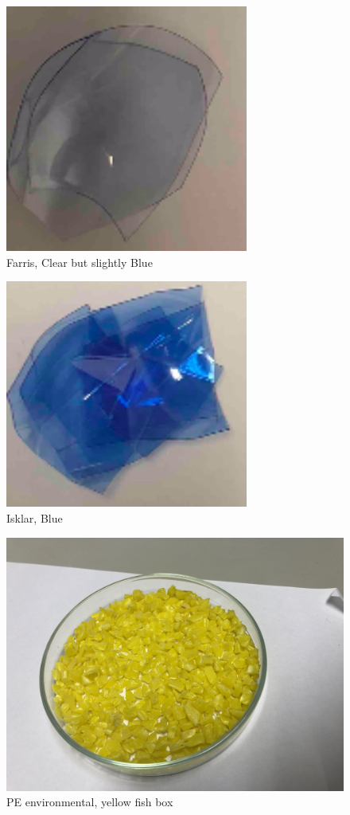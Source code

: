 \begin{appendices}
\begin{figure}
    \centering
    \includegraphics[width = 8cm]{Images/appendix/farris.png}
    \caption[Farris, Clear]{Farris, Clear but slightly Blue}
    \label{fig:my_label}
\end{figure}

\begin{figure}
    \centering
    \includegraphics[width = 8cm]{Images/appendix/isklar.png}
    \caption{Isklar, Blue}
    \label{fig:isklar}
\end{figure}

\begin{figure}
    \centering
    \includegraphics[width = 12cm]{Images/appendix/PE-Yellow-Fish-Box-Beached-Texel.jpg}
    \caption[PE Environmental, Yellow]{PE environmental, yellow fish box}
    \label{fig:pe_env}
\end{figure}



\end{appendices}
